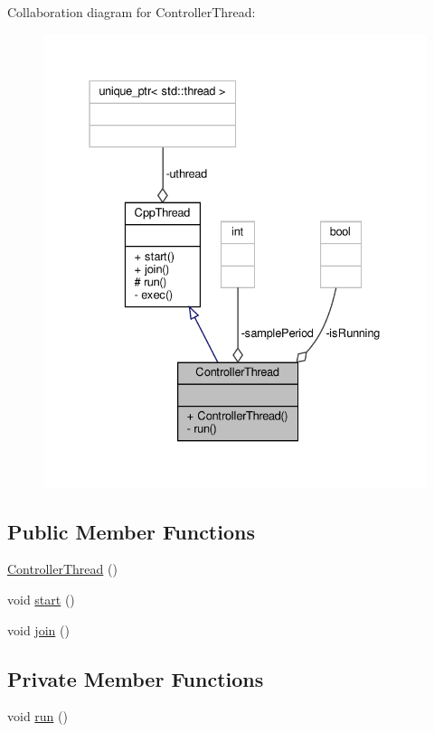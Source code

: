 Collaboration diagram for Controller\+Thread\+:\nopagebreak
\begin{figure}[H]
\begin{center}
\leavevmode
\includegraphics[width=331pt]{classControllerThread__coll__graph}
\end{center}
\end{figure}
\subsection*{Public Member Functions}
\begin{DoxyCompactItemize}
\item 
\hyperlink{classControllerThread_a00cd6502504f5f1e680e6be3f60a987d}{Controller\+Thread} ()
\item 
void \hyperlink{classCppThread_a1be46d1be000f41a763289300623c609}{start} ()
\item 
void \hyperlink{classCppThread_a8ff0fda6b913cc53764caef0e1200f3f}{join} ()
\end{DoxyCompactItemize}
\subsection*{Private Member Functions}
\begin{DoxyCompactItemize}
\item 
void \hyperlink{classControllerThread_ae8206a23ab1a414f2956424def2e759c}{run} ()
\end{DoxyCompactItemize}
